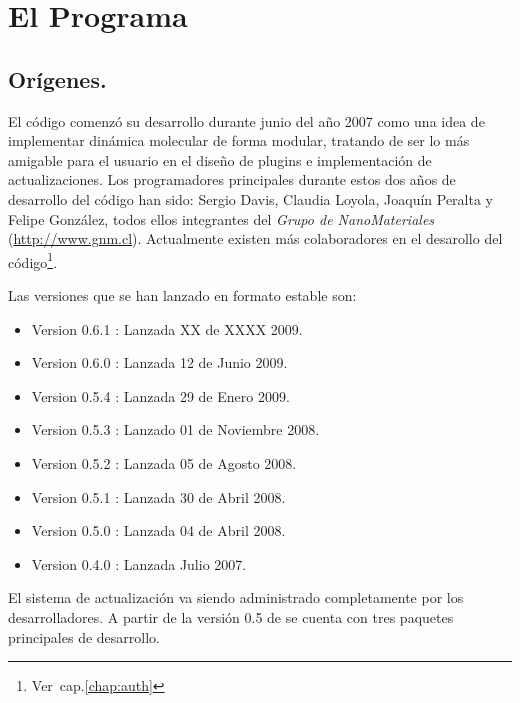 \chapter{El Programa}
\label{chap:lpmd}

\section{Or\'igenes.}

El c\'odigo {\lpmd} comenz\'o su desarrollo durante junio del a\~no 2007 como una idea de implementar din\'amica molecular de forma modular, tratando de ser lo m\'as amigable para el usuario en el dise\~no de plugins e implementaci\'on de actualizaciones. Los programadores principales durante estos dos a\~nos de desarrollo del c\'odigo han sido: Sergio Davis, Claudia Loyola, Joaqu\'in Peralta y Felipe Gonz\'alez, todos ellos integrantes del \textit{Grupo de NanoMateriales} (\url{http://www.gnm.cl}). Actualmente existen m\'as colaboradores en el desarollo del c\'odigo\footnote{Ver~cap.\ref{chap:auth}}.

Las versiones que se han lanzado en formato estable son:

\begin{itemize}
 \item Version 0.6.1 : Lanzada XX de XXXX 2009.
 \item Version 0.6.0 : Lanzada 12 de Junio 2009.
 \item Version 0.5.4 : Lanzada 29 de Enero 2009.
 \item Version 0.5.3 : Lanzado 01 de Noviembre 2008.
 \item Version 0.5.2 : Lanzada 05 de Agosto 2008.
 \item Version 0.5.1 : Lanzada 30 de Abril 2008.
 \item Version 0.5.0 : Lanzada 04 de Abril 2008.
 \item Version 0.4.0 : Lanzada Julio 2007.
\end{itemize}

El sistema de actualizaci\'on va siendo administrado completamente por los desarrolladores. A partir de la versi\'on 0.5 de {\lpmd} se cuenta con tres paquetes principales de desarrollo.

